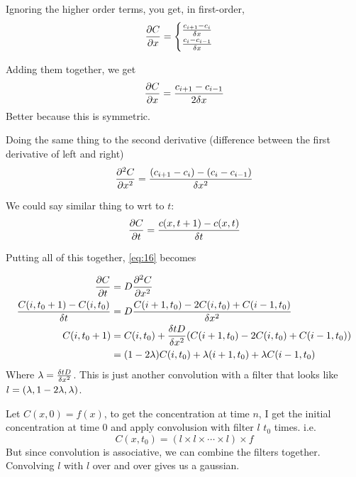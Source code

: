 Ignoring the higher order terms, you get, in first-order,
\begin{equation}
  \label{eq:18}
\frac{\partial C}{\partial x} =
\begin{cases}
\frac{  c_{i+1} - c_i }{\delta x} \\  
 \frac{  c_{i} - c_{i-1} }{\delta x} 
\end{cases}
\end{equation}

Adding them together, we get
\begin{equation}
  \label{eq:19}
 \frac{\partial C}{\partial x}=  \frac{  c_{i+1} - c_{i-1} }{2\delta x} 
\end{equation}
Better because this is symmetric. 

Doing the same thing to the second derivative (difference between the
first derivative of left and right)
\begin{equation}
  \label{eq:20}
  \frac{\partial^2 C}{\partial x^2} = \frac{  (c_{i+1} - c_i) - (c_{i} - c_{i-1}) }{\delta x^2} 
\end{equation}

We could say similar thing to wrt to $t$:
\begin{equation}
  \label{eq:21}
  \frac{\partial C}{\partial t} = \frac{ c(x,t+1)- c(x,t)}{\delta t} 
\end{equation}

Putting all of this together, \eqref{eq:16} becomes

\begin{align*}
  \frac{\partial C}{\partial t} &= D \frac{\partial^2 C}{\partial
    x^2}\\
 \frac{ C(i,t_0+1)- C(i,t_0)}{\delta t} &= D \frac{ C(i+1, t_0) - 2C(i,t_0) +
   C(i-1, t_0) }{\delta x^2} \\
C(i,t_0+1)&= C(i,t_0) + \frac{\delta t D}{\delta x^2} (C(i+1, t_0) - 2C(i,t_0) +
   C(i-1, t_0))\\
 &= (1-2\lambda)C(i,t_0) + \lambda (i+1,t_0) + \lambda C(i-1, t_0)   
\end{align*}
Where $\lambda = \frac{\delta t D}{\delta x^2} $. This is just another
convolution with a filter that looks like $l = (\lambda, 1-2\lambda, \lambda)$.

Let $C(x,0) = f(x)$, to get the concentration at time $n$, I get the
initial concentration at time $0$ and apply convolusion with filter
$l$ $t_0$ times. i.e. $$C(x,t_0) = (l\times l \times \cdots \times
l)\times f$$But since convolution is associative, we can combine
the filters together. Convolving $l$ with $l$ over and over gives us a
gaussian.

